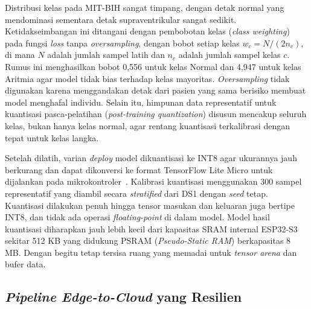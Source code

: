 Distribusi kelas pada MIT-BIH sangat timpang, dengan detak normal yang mendominasi
sementara detak supraventrikular sangat sedikit. Ketidakseimbangan ini ditangani dengan pembobotan
kelas (\emph{class weighting}) pada fungsi \emph{loss} tanpa \emph{oversampling},
dengan bobot setiap kelas $w_c = N/(2 n_c)$, di mana $N$ adalah jumlah sampel latih dan
$n_c$ adalah jumlah sampel kelas $c$. Rumus ini menghasilkan bobot 0,556 untuk kelas
Normal dan 4,947 untuk kelas Aritmia agar model tidak bias terhadap kelas mayoritas.
\emph{Oversampling} tidak digunakan karena menggandakan detak dari pasien yang sama
berisiko membuat model menghafal individu. Selain itu, himpunan
data representatif untuk kuantisasi pasca-pelatihan (\emph{post-training quantization})
disusun mencakup seluruh kelas, bukan hanya kelas normal, agar rentang
kuantisasi terkalibrasi dengan tepat untuk kelas langka.

Setelah dilatih, varian \textit{deploy} model dikuantisasi ke INT8 agar ukurannya jauh berkurang dan dapat dikonversi ke format TensorFlow Lite Micro untuk dijalankan pada mikrokontroler~\cite{jacob_2018, david_2021}. Kalibrasi kuantisasi menggunakan 300 sampel representatif yang diambil secara \textit{stratified} dari DS1 dengan \textit{seed} tetap. Kuantisasi dilakukan penuh hingga tensor masukan dan keluaran juga bertipe INT8, dan tidak ada operasi \textit{floating-point} di dalam model. Model hasil kuantisasi diharapkan jauh lebih kecil dari kapasitas SRAM internal ESP32-S3 sekitar 512 KB yang didukung PSRAM (\textit{Pseudo-Static RAM}) berkapasitas 8 MB. Dengan begitu tetap tersisa ruang yang memadai untuk \textit{tensor arena} dan bufer data.

\subsection{\textit{Pipeline Edge-to-Cloud} yang Resilien}

